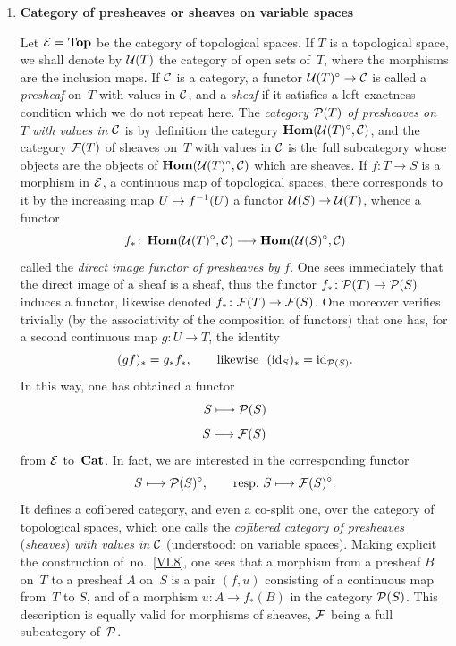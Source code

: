 \begin{enumerate}
\medskip
\item[b)] \textbf{Category of presheaves or sheaves on
variable spaces}

Let $\cal{E}=\mathbf{Top}$ be the category of topological spaces.
If $T$ is a topological space, we shall denote by $\cal{U}(T)$ the
category of open sets of~$T$, where the morphisms are the
inclusion maps. If $\cal{C}$ is a category, a
functor $\cal{U}(T)^\circ\to \cal{C}$ is called a
\emph{presheaf} on~$T$ with values in $\cal{C}$, and a
\emph{sheaf} if it satisfies a left exactness condition
which we do not repeat here. The \emph{category
$\cal{P}(T)$ of presheaves on~$T$ with values in
$\cal{C}$} is by definition the category
$\SheafHom(\cal{U}(T)^\circ,\cal{C})$, and the category
$\cal{F}(T)$ of sheaves on~$T$ with values in $\cal{C}$ is the
full subcategory whose objects are the objects of
$\SheafHom(\cal{U}(T)^\circ,\cal{C})$ which are sheaves. If
$f\colon T\to S$ is a morphism in $\cal{E}$, \ie a
continuous map of topological spaces, there corresponds to it by
the increasing map $U\mto f^{-1}(U)$ a functor
$\cal{U}(S)\to \cal{U}(T)$, whence a functor
$$
f_*\colon\SheafHom(\cal{U}(T)^\circ,\cal{C})\to
\SheafHom(\cal{U}(S)^\circ,\cal{C})
$$
called the \emph{direct image functor of presheaves by}
$f$. One sees immediately that the direct image of a sheaf is a
sheaf, thus the functor
$f_*\colon \cal{P}(T)\to\cal{P}(S)$
induces a functor, likewise denoted
$f_*\colon\cal{F}(T)\to\cal{F}(S)$.
One moreover verifies trivially (by the associativity of the
composition of functors) that one has, for a second continuous
map $g\colon U\to T$, the identity
$$
(gf)_* =g_*f_*,\qquad
\text{likewise }\ (\id_S)_*=\id_{\cal{P}(S)}.
$$
In this way, one has obtained a functor
$$
S\mto \cal{P}(S)
$$
\resp $$
S\mto \cal{F}(S)
$$
from
$\cal{E}$ to~$\Cat$. In fact, we are interested in the
corresponding functor
$$
S\mto \cal{P}(S)^\circ,\qquad\text{\resp~}S\mto
\cal{F}(S)^\circ.
$$
It defines a cofibered category, and even a
co-split one, over the category of topological spaces, which one
calls the \emph{cofibered category of presheaves}
(\resp \emph{sheaves}) \emph{with values in} $\cal{C}$
(understood: on variable spaces). Making explicit the construction
of~no.~\ref{VI.8}, one sees that a morphism from a presheaf $B$ on~$T$
to a presheaf $A$ on~$S$ is a pair $(f,u)$ consisting
of a continuous map from~$T$ to $S$, and of a morphism $u\colon
A\to f_*(B)$ in the category $\cal{P}(S)$. This description
is equally valid for morphisms of sheaves, $\cal{F}$
being a full subcategory of~$\cal{P}$.


\end{enumerate}
